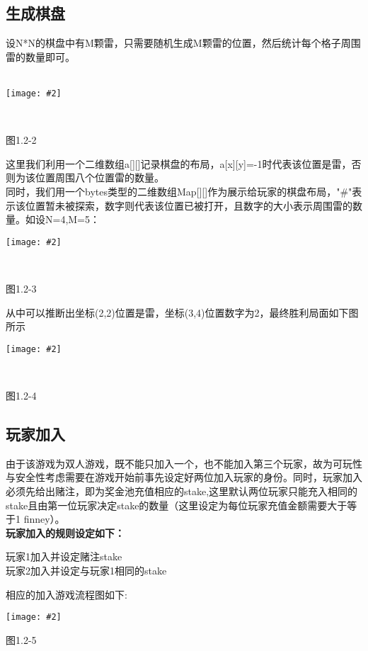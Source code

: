 \documentclass[UTF8]{ctexart}
\newcommand\picturehere[2][1]{\centerline{\texttt{[image: \#2]}}}
\begin{document}
  \subsection{生成棋盘}
  \indent 设N*N的棋盘中有M颗雷，只需要随机生成M颗雷的位置，然后统计每个格子周围雷的数量即可。\\
  \\
  \picturehere[0.5]{s1.png}\\
  \begin{center} 图1.2-2 \end{center} %

  \indent 这里我们利用一个二维数组a[][]记录棋盘的布局，a[x][y]=-1时代表该位置是雷，否则为该位置周围八个位置雷的数量。\\
  \indent 同时，我们用一个bytes类型的二维数组Map[][]作为展示给玩家的棋盘布局，"\#"表示该位置暂未被探索，数字则代表该位置已被打开，且数字的大小表示周围雷的数量。如设N=4,M=5：\\
  \picturehere{s4.png}\\
  \begin{center} 图1.2-3 \end{center}
  \indent 从中可以推断出坐标(2,2)位置是雷，坐标(3,4)位置数字为2，最终胜利局面如下图所示\\
  \picturehere{s5.png}\\
  \begin{center} 图1.2-4 \end{center}
	\subsection{玩家加入}
	\indent 由于该游戏为双人游戏，既不能只加入一个，也不能加入第三个玩家，故为可玩性与安全性考虑需要在游戏开始前事先设定好两位加入玩家的身份。同时，玩家加入必须先给出赌注，即为奖金池充值相应的stake,这里默认两位玩家只能充入相同的stake且由第一位玩家决定stake的数量（这里设定为每位玩家充值金额需要大于等于1 finney）。\\
	\heiti \indent \textbf{玩家加入的规则设定如下：}
	\begin{center} 玩家1加入并设定赌注stake\\ 玩家2加入并设定与玩家1相同的stake \end{center}
	\songti
	\indent 相应的加入游戏流程图如下:\\
	\picturehere[0.6]{s6.png}
	\begin{center}图1.2-5\end{center}
\end{document}

